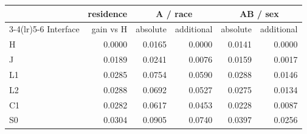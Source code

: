 \begin{tabular}{lrrrrr}
\toprule
& residence & \multicolumn{2}{c}{A / race} & \multicolumn{2}{c}{AB / sex} \\
\cmidrule(lr){3-4}\cmidrule(lr){5-6}
Interface & gain vs H & absolute & additional & absolute & additional \\
\midrule
H & 0.0000 & 0.0165 & 0.0000 & 0.0141 & 0.0000 \\
J & 0.0189 & 0.0241 & 0.0076 & 0.0159 & 0.0017 \\
L1 & 0.0285 & 0.0754 & 0.0590 & 0.0288 & 0.0146 \\
L2 & 0.0288 & 0.0692 & 0.0527 & 0.0275 & 0.0134 \\
C1 & 0.0282 & 0.0617 & 0.0453 & 0.0228 & 0.0087 \\
S0 & 0.0304 & 0.0905 & 0.0740 & 0.0397 & 0.0256 \\
\bottomrule
\end{tabular}
